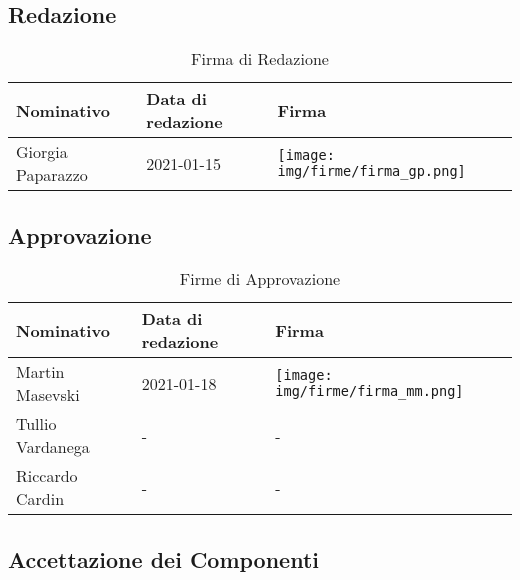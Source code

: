 \documentclass[../piano_di_progetto.tex]{subfiles}
\begin{document}
\subsection{Redazione}%
\label{sub:red}

\begin{table}[!ht]
	\centering
	\begin{tabular}{|l|l|l|}
		\hline
		\rowcolor{lightgray}
		\textbf{Nominativo} & \textbf{Data di redazione} & \textbf{Firma}\\ 
		\hline
			Giorgia Paparazzo & 2021-01-15 & \texttt{[image: img/firme/firma\_gp.png]} \\
		\hline
	\end{tabular}
	\caption{Firma di Redazione}
\end{table}


\subsection{Approvazione}%
\label{sub:app}

\begin{table}[!ht]
	\centering
	\begin{tabular}{|l|l|l|}
		\hline
		\rowcolor{lightgray}
		\textbf{Nominativo} & \textbf{Data di redazione} & \textbf{Firma} \\ 

		\hline
			Martin Masevski & 2021-01-18 & \texttt{[image: img/firme/firma\_mm.png]} \\ 
			Tullio Vardanega & - & - \\
			Riccardo Cardin  & - & - \\
		\hline
	\end{tabular}
		\caption{Firme di Approvazione}
\end{table}


\newpage
\subsection{Accettazione dei Componenti}%
\label{sub:acc_comp}
\end{document}

